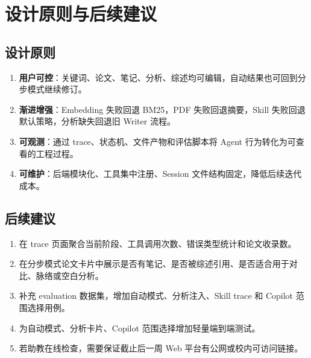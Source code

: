\documentclass[12pt,a4paper,onecolumn]{ctexart}
\begin{document}
\section{设计原则与后续建议}

\subsection{设计原则}

\begin{enumerate}[leftmargin=2em]
  \item \textbf{用户可控}：关键词、论文、笔记、分析、综述均可编辑，自动结果也可回到分步模式继续修订。
  \item \textbf{渐进增强}：Embedding 失败回退 BM25，PDF 失败回退摘要，Skill 失败回退默认策略，分析缺失回退旧 Writer 流程。
  \item \textbf{可观测}：通过 trace、状态机、文件产物和评估脚本将 Agent 行为转化为可查看的工程过程。
  \item \textbf{可维护}：后端模块化、工具集中注册、Session 文件结构固定，降低后续迭代成本。
\end{enumerate}

\subsection{后续建议}

\begin{enumerate}[leftmargin=2em]
  \item 在 trace 页面聚合当前阶段、工具调用次数、错误类型统计和论文收录数。
  \item 在分步模式论文卡片中展示是否有笔记、是否被综述引用、是否适合用于对比、脉络或空白分析。
  \item 补充 evaluation 数据集，增加自动模式、分析注入、Skill trace 和 Copilot 范围选择用例。
  \item 为自动模式、分析卡片、Copilot 范围选择增加轻量端到端测试。
  \item 若助教在线检查，需要保证截止后一周 Web 平台有公网或校内可访问链接。
\end{enumerate}
\end{document}
